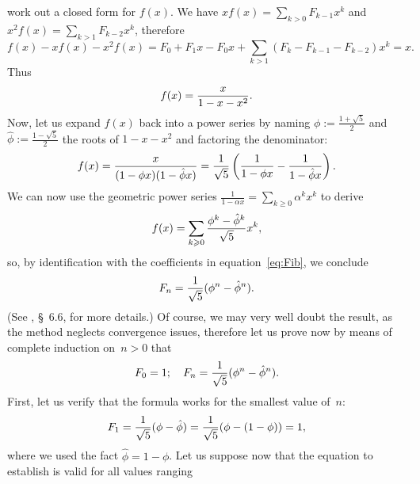 work out a closed form for \(f(x)\). We have \(xf(x) = \sum_{k >
  0}{F_{k-1}x^k}\) and \(x^2f(x) = \sum_{k>1}{F_{k-2}x^k}\), therefore
\begin{equation*}
f(x) - xf(x) - x^2f(x) = F_0 + F_1x - F_0x 
                         + \sum_{k>1}{(F_k - F_{k-1} - F_{k-2})x^k}
                       = x.
\end{equation*}
Thus
\begin{equation*}
\abovedisplayskip=0pt
\belowdisplayskip=2pt
f(x) = \frac{x}{1 - x - x^2}.
\end{equation*}
Now, let us expand \(f(x)\) back into a power series by naming \(\phi
:= \frac{1+\sqrt{5}}{2}\) and \(\hat\phi := \frac{1-\sqrt{5}}{2}\) the
roots of \(1 - x - x^2\) and factoring the denominator:
\begin{equation*}
\abovedisplayskip=4pt
\belowdisplayskip=4pt
f(x) = \frac{x}{(1-\phi x)(1-\hat\phi x)}
     = \frac{1}{\sqrt{5}}\left(\frac{1}{1 - \phi x}
                              - \frac{1}{1 - \hat\phi x}\right).
\end{equation*}
We can now use the geometric power series \(\frac{1}{1-\alpha x} =
\sum_{k \geqslant 0}{\alpha^kx^k}\) to derive
\begin{equation*}
\abovedisplayskip=4pt
\belowdisplayskip=4pt
f(x) = \sum_{k \geqslant 0}{\frac{\phi^k-\hat\phi^k}{\sqrt{5}}}x^k,
\end{equation*}
so, by identification with the coefficients in
equation~\eqref{eq:Fib}, we conclude
\begin{equation*}
\abovedisplayskip=4pt
\belowdisplayskip=4pt
F_n = \frac{1}{\sqrt{5}}(\phi^n - \hat\phi^n).
\end{equation*}
(See \cite{GrahamKnuthPatashnik_1994}, \S~6.6, for more details.)  Of
course, we may very well doubt the result, as the method neglects
convergence issues, therefore let us prove
now by means of complete induction on~\(n > 0\) that
\begin{equation*}
\abovedisplayskip=4pt
\belowdisplayskip=4pt
F_0 = 1;\quad F_n = \frac{1}{\sqrt{5}}(\phi^n - \hat\phi^n).
\end{equation*}
First, let us verify that the formula works for the smallest value of~\(n\):
\begin{equation*}
\abovedisplayskip=4pt
\belowdisplayskip=4pt
F_1 = \frac{1}{\sqrt{5}}(\phi - \hat\phi)
    = \frac{1}{\sqrt{5}}(\phi - (1 - \phi)) = 1,
\end{equation*}
where we used the fact \(\hat\phi = 1 - \phi\). Let us suppose now
that the equation to establish is valid for all values ranging
